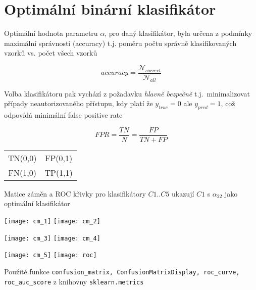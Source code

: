 \documentclass[11pt]{article}
\begin{document}
    \section{Optimální binární klasifikátor}\label{sec:opt_clf}
    Optimální hodnota parametru  $\alpha$, pro daný klasifikátor,
    byla určena z podmínky maximální správnosti (accuracy) t.j. poměru počtu správně
    klasifikovaných vzorků vs. počet všech vzorků

    \begin{equation}
        accuracy = \frac{\mathcal{N}_{correct}}{\mathcal{N}_{all}}\label{eq:accuracy}
    \end{equation}

    Volba klasifikátoru pak vychází z požadavku {\em hlavně bezpečně} t.j.\
    minimalizovat případy neautorizovaného přístupu, kdy platí že $y_{true}=0$ ale $y_{pred}=1$,
    což odpovídá minimální false positive rate

    \begin{equation}
        FPR = \frac{TN}{N}=\frac{FP}{TN + FP}\label{eq:fpr}
    \end{equation}

    \begin{center}
        \begin{tabular}{ c c }
            TN(0,0) & FP(0,1) \\
            FN(1,0) & TP(1,1) \\
        \end{tabular}
    \end{center}

    Matice záměn a ROC křivky pro klasifikátory $C1..C5$ ukazují $C1$ s $\alpha_{22}$ jako
    optimální klasifikátor

    \texttt{[image: cm\_1]}
    \texttt{[image: cm\_2]}

    \texttt{[image: cm\_3]}
    \texttt{[image: cm\_4]}

    \texttt{[image: cm\_5]}
    \texttt{[image: roc]}

    Použité funkce
    \texttt{confusion\_matrix, ConfusionMatrixDisplay, roc\_curve, roc\_auc\_score}
    z knihovny \texttt{sklearn.metrics}
\end{document}

